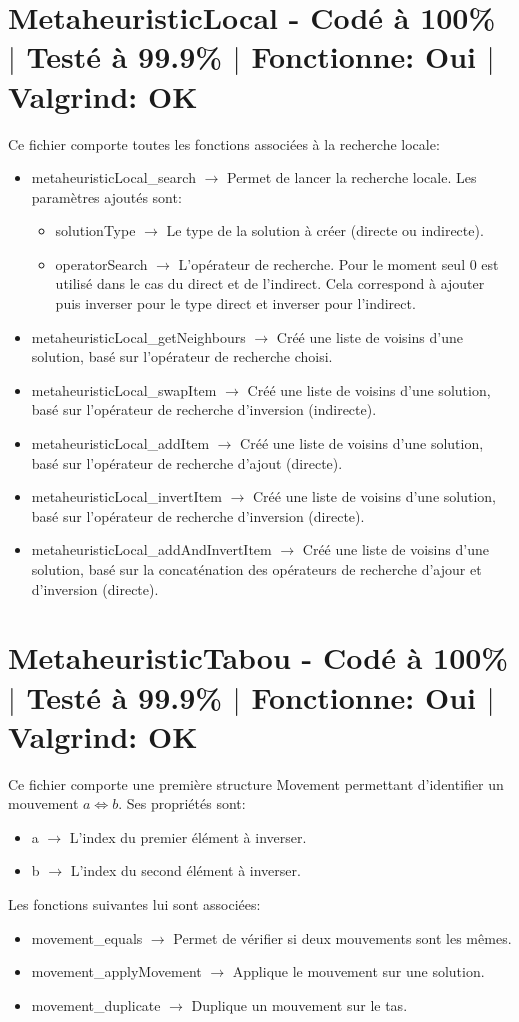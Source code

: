 \documentclass{EPUProjetPeiP}
\newcommand{\comp}[5]{
	\section[#1]{#1 {\small - Codé à #2\% $\vert$ Testé à #3\% $\vert$ Fonctionne: #4 $\vert$ Valgrind: #5}}
}
\begin{document}
\comp{MetaheuristicLocal}{100}{99.9}{Oui}{OK}
Ce fichier comporte toutes les fonctions associées à la recherche locale:
\begin{itemize}
	\item metaheuristicLocal\_search $\longrightarrow$ Permet de lancer la recherche locale. Les paramètres ajoutés sont:
	\begin{itemize}
		\item solutionType $\longrightarrow$ Le type de la solution à créer (directe ou indirecte).
		\item operatorSearch $\longrightarrow$ L'opérateur de recherche. Pour le moment seul 0 est utilisé dans le cas du direct et de l'indirect. Cela correspond à ajouter puis inverser pour le type direct et inverser pour l'indirect.
	\end{itemize}
	\item metaheuristicLocal\_getNeighbours $\longrightarrow$ Créé une liste de voisins d'une solution, basé sur l'opérateur de recherche choisi.
	\item metaheuristicLocal\_swapItem $\longrightarrow$ Créé une liste de voisins d'une solution, basé sur l'opérateur de recherche d'inversion (indirecte).
	\item metaheuristicLocal\_addItem $\longrightarrow$ Créé une liste de voisins d'une solution, basé sur l'opérateur de recherche d'ajout (directe).
	\item metaheuristicLocal\_invertItem $\longrightarrow$ Créé une liste de voisins d'une solution, basé sur l'opérateur de recherche d'inversion (directe).
	\item metaheuristicLocal\_addAndInvertItem $\longrightarrow$ Créé une liste de voisins d'une solution, basé sur la concaténation des opérateurs de recherche d'ajour et d'inversion (directe).
\end{itemize}

\comp{MetaheuristicTabou}{100}{99.9}{Oui}{OK}
Ce fichier comporte une première structure Movement permettant d'identifier un mouvement $a\Leftrightarrow b$. Ses propriétés sont:
\begin{itemize}
	\item a $\longrightarrow$ L'index du premier élément à inverser.
	\item b $\longrightarrow$ L'index du second élément à inverser.\\
\end{itemize}

Les fonctions suivantes lui sont associées:
\begin{itemize}
	\item movement\_equals $\longrightarrow$ Permet de vérifier si deux mouvements sont les mêmes.
	\item movement\_applyMovement $\longrightarrow$ Applique le mouvement sur une solution.
	\item movement\_duplicate $\longrightarrow$ Duplique un mouvement sur le tas.\\
\end{itemize}
\end{document}
